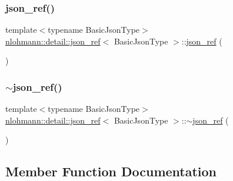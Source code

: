 \subsubsection{\texorpdfstring{json\_ref()}{json\_ref()}\hspace{0.1cm}{\footnotesize\ttfamily [6/6]}}
{\footnotesize\ttfamily template$<$typename Basic\+Json\+Type$>$ \\
\mbox{\hyperlink{classnlohmann_1_1detail_1_1json__ref}{nlohmann\+::detail\+::json\+\_\+ref}}$<$ Basic\+Json\+Type $>$\+::\mbox{\hyperlink{classnlohmann_1_1detail_1_1json__ref}{json\+\_\+ref}} (\begin{DoxyParamCaption}\item[{const \mbox{\hyperlink{classnlohmann_1_1detail_1_1json__ref}{json\+\_\+ref}}$<$ Basic\+Json\+Type $>$ \&}]{ }\end{DoxyParamCaption})\hspace{0.3cm}{\ttfamily [delete]}}

\mbox{\label{classnlohmann_1_1detail_1_1json__ref_a8bcd4cfcafe952ce5140f8cb35ebe2f6}} 
\subsubsection{\texorpdfstring{$\sim$json\_ref()}{~json\_ref()}}
{\footnotesize\ttfamily template$<$typename Basic\+Json\+Type$>$ \\
\mbox{\hyperlink{classnlohmann_1_1detail_1_1json__ref}{nlohmann\+::detail\+::json\+\_\+ref}}$<$ Basic\+Json\+Type $>$\+::$\sim$\mbox{\hyperlink{classnlohmann_1_1detail_1_1json__ref}{json\+\_\+ref}} (\begin{DoxyParamCaption}{ }\end{DoxyParamCaption})\hspace{0.3cm}{\ttfamily [default]}}



\subsection{Member Function Documentation}
\mbox{\label{classnlohmann_1_1detail_1_1json__ref_ae39e523218bf05cac3fb5b5b1cd5efb6}} 
